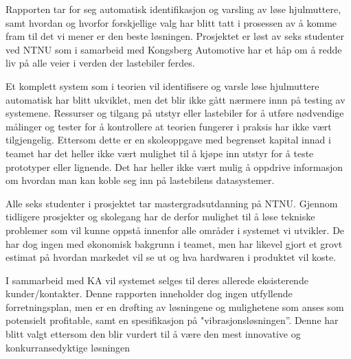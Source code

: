 Rapporten tar for seg automatisk identifikasjon og varsling av løse hjulmuttere, samt hvordan og hvorfor forskjellige
valg har blitt tatt i prosessen av å komme fram til det vi mener er den beste løsningen. Prosjektet er løst av seks studenter ved NTNU
som i samarbeid med Kongsberg Automotive har et håp om å redde liv på alle veier i verden der lastebiler ferdes. 

Et komplett system som i teorien vil identifisere og varsle løse hjulmuttere automatisk har blitt ukviklet, men det blir ikke
gått nærmere innn på testing av systemene. Ressurser og tilgang på utstyr eller lastebiler for å utføre 
nødvendige målinger og tester for å kontrollere at teorien fungerer i praksis har ikke vært tilgjengelig. Ettersom dette er en skoleoppgave med begrenset
kapital innad i teamet har det heller ikke vært mulighet til å kjøpe inn utstyr for å teste prototyper eller lignende. Det har heller ikke 
vært mulig å oppdrive informasjon om hvordan man kan koble seg inn på lastebilens datasystemer.

Alle seks studenter i prosjektet tar mastergradsutdanning på NTNU. Gjennom tidligere prosjekter og skolegang har de derfor
mulighet til å løse tekniske problemer som vil kunne oppstå innenfor alle områder i systemet vi utvikler. De har dog ingen med
økonomisk bakgrunn i teamet, men har likevel gjort et grovt estimat på hvordan markedet vil se ut og hva hardwaren i produktet
vil koste.

I sammarbeid med KA vil systemet selges til deres allerede eksisterende kunder/kontakter. Denne rapporten
inneholder dog ingen utfyllende forretningsplan, men er en drøfting av løsningene og mulighetene som anses som
potensielt profitable, samt en spesifikasjon på "vibrasjonsløsningen''. Denne har blitt valgt ettersom den blir vurdert
til å være den mest innovative og konkurransedyktige løsningen

